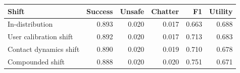 \begin{tabular}{lrrrrr}
\toprule
Shift & Success & Unsafe & Chatter & F1 & Utility \\
\midrule
In-distribution & 0.893 & 0.020 & 0.017 & 0.663 & 0.688 \\
User calibration shift & 0.892 & 0.020 & 0.017 & 0.713 & 0.683 \\
Contact dynamics shift & 0.890 & 0.020 & 0.019 & 0.710 & 0.678 \\
Compounded shift & 0.888 & 0.020 & 0.020 & 0.751 & 0.671 \\
\bottomrule
\end{tabular}
